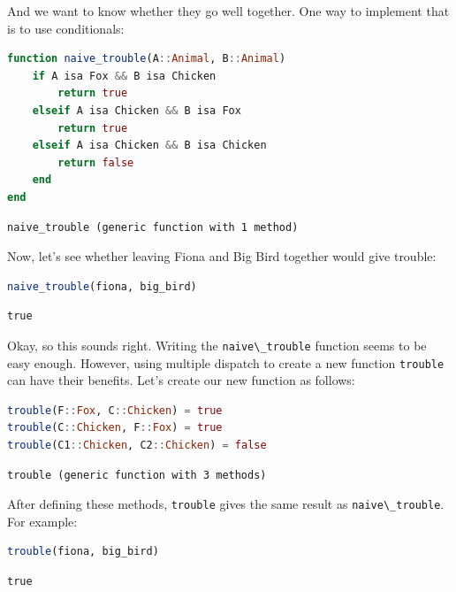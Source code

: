 \documentclass[
  notoc %
]{tufte-book}
\newcommand{\passthrough}[1]{#1}
\begin{document}
And we want to know whether they go well together. One way to implement
that is to use conditionals:

\begin{lstlisting}[language=Julia]
function naive_trouble(A::Animal, B::Animal)
    if A isa Fox && B isa Chicken
        return true
    elseif A isa Chicken && B isa Fox
        return true
    elseif A isa Chicken && B isa Chicken
        return false
    end
end
\end{lstlisting}

\begin{lstlisting}[language=Output]
naive_trouble (generic function with 1 method)
\end{lstlisting}

Now, let's see whether leaving Fiona and Big Bird together would give
trouble:

\begin{lstlisting}[language=Julia]
naive_trouble(fiona, big_bird)
\end{lstlisting}

\begin{lstlisting}[language=Output]
true
\end{lstlisting}

Okay, so this sounds right. Writing the
\passthrough{\lstinline!naive\_trouble!} function seems to be easy
enough. However, using multiple dispatch to create a new function
\passthrough{\lstinline!trouble!} can have their benefits. Let's create
our new function as follows:

\begin{lstlisting}[language=Julia]
trouble(F::Fox, C::Chicken) = true
trouble(C::Chicken, F::Fox) = true
trouble(C1::Chicken, C2::Chicken) = false
\end{lstlisting}

\begin{lstlisting}[language=Output]
trouble (generic function with 3 methods)
\end{lstlisting}

After defining these methods, \passthrough{\lstinline!trouble!} gives
the same result as \passthrough{\lstinline!naive\_trouble!}. For
example:

\begin{lstlisting}[language=Julia]
trouble(fiona, big_bird)
\end{lstlisting}

\begin{lstlisting}[language=Output]
true
\end{lstlisting}
\end{document}
